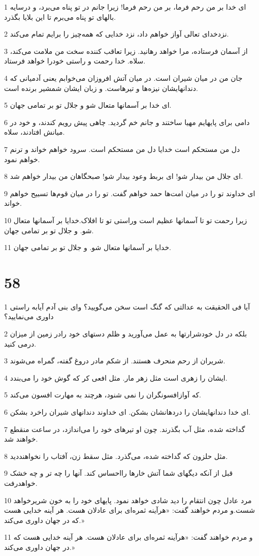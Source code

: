 \par 1 ای خدا بر من رحم فرما، بر من رحم فرما! زیرا جانم در تو پناه می‌برد، و درسایه بالهای تو پناه می‌برم تا این بلایا بگذرد.
\par 2 نزدخدای تعالی آواز خواهم داد، نزد خدایی که همه‌چیز را برایم تمام می‌کند.
\par 3 از آسمان فرستاده، مرا خواهد رهانید. زیرا تعاقب کننده سخت من ملامت می‌کند، سلاه. خدا رحمت و راستی خودرا خواهد فرستاد.
\par 4 جان من در میان شیران است. در میان آتش افروزان می‌خوابم یعنی آدمیانی که دندانهایشان نیزه‌ها و تیرهاست. و زبان ایشان شمشیر برنده است.
\par 5 ‌ای خدا بر آسمانها متعال شو و جلال تو بر تمامی جهان.
\par 6 دامی برای پایهایم مهیا ساختند و جانم خم گردید. چاهی پیش رویم کندند، و خود در میانش افتادند، سلاه.
\par 7 دل من مستحکم است خدایا دل من مستحکم است. سرود خواهم خواند و ترنم خواهم نمود.
\par 8 ‌ای جلال من بیدار شو! ای بربط وعود بیدار شو! صبحگاهان من بیدار خواهم شد.
\par 9 ‌ای خداوند تو را در میان امت‌ها حمد خواهم گفت. تو را در میان قوم‌ها تسبیح خواهم خواند.
\par 10 زیرا رحمت تو تا آسمانها عظیم است وراستی تو تا افلاک.خدایا بر آسمانها متعال شو. و جلال تو بر تمامی جهان.
\par 11 خدایا بر آسمانها متعال شو. و جلال تو بر تمامی جهان.
 
\chapter{58}

\par 1 آیا فی الحقیقت به عدالتی که گنگ است سخن می‌گویید؟ و‌ای بنی آدم آیابه راستی داوری می‌نمایید؟
\par 2 بلکه در دل خودشرارتها به عمل می‌آورید و ظلم دستهای خود رادر زمین از میزان درمی کنید.
\par 3 شریران از رحم منحرف هستند. از شکم مادر دروغ گفته، گمراه می‌شوند.
\par 4 ایشان را زهری است مثل زهر مار. مثل افعی کر که گوش خود را می‌بندد.
\par 5 که آوازافسونگران را نمی شنود، هر‌چند به مهارت افسون می‌کند.
\par 6 ‌ای خدا دندانهایشان را دردهانشان بشکن. ای خداوند دندانهای شیران راخرد بشکن.
\par 7 گداخته شده، مثل آب بگذرند. چون او تیرهای خود را می‌اندازد، در ساعت منقطع خواهند شد.
\par 8 مثل حلزون که گداخته شده، می‌گذرد. مثل سقط زن، آفتاب را نخواهنددید.
\par 9 قبل از آنکه دیگهای شما آتش خارها رااحساس کند. آنها را چه تر و چه خشک خواهدرفت.
\par 10 مرد عادل چون انتقام را دید شادی خواهد نمود. پایهای خود را به خون شریرخواهد شست.و مردم خواهند گفت: «هرآینه ثمره‌ای برای عادلان هست. هر آینه خدایی هست که در جهان داوری می‌کند.»
\par 11 و مردم خواهند گفت: «هرآینه ثمره‌ای برای عادلان هست. هر آینه خدایی هست که در جهان داوری می‌کند.»
 
